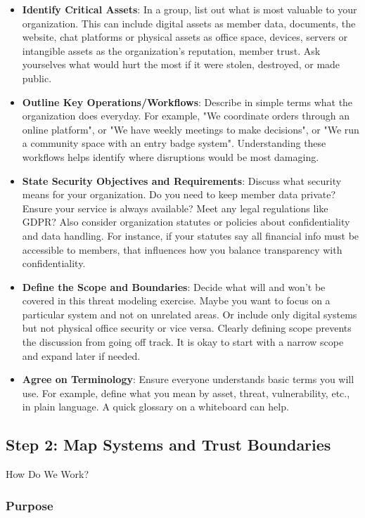\begin{itemize}
    \item \textbf{Identify Critical Assets}: In a group, list out what is most
valuable to your organization. This can include digital assets as member data,
documents, the website, chat platforms or physical assets as office space, devices,
servers or intangible assets as the organization's reputation, member trust.
Ask yourselves what would hurt the most if it were stolen, destroyed, or made
public.
    \item \textbf{Outline Key Operations/Workflows}: Describe in simple terms
what the organization does everyday. For example, "We coordinate orders through an
online platform", or "We have weekly meetings to make decisions", or "We run a
community space with an entry badge system". Understanding these workflows helps
identify where disruptions would be most damaging.
    \item \textbf{State Security Objectives and Requirements}: Discuss what
security means for your organization. Do you need to keep member data private? Ensure
your service is always available? Meet any legal regulations like GDPR? Also consider
organization statutes or policies about confidentiality and data handling.
For instance, if your statutes say all financial info must be accessible
to members, that influences how you balance transparency with confidentiality.
    \item \textbf{Define the Scope and Boundaries}: Decide what will and won't
be covered in this threat modeling exercise. Maybe you want to focus on a
particular system and not on unrelated areas. Or include only digital systems but not
physical office security or vice versa. Clearly defining scope prevents the discussion from
going off track. It is okay to start with a narrow scope and expand later if needed.
    \item \textbf{Agree on Terminology}: Ensure everyone understands basic terms
you will use. For example, define what you mean by asset, threat, vulnerability,
etc., in plain language. A quick glossary on a whiteboard can help.
\end{itemize}

\subsection{Step 2: Map Systems and Trust Boundaries}
\label{subsec:Step2}

How Do We Work?

\subsubsection{Purpose}

